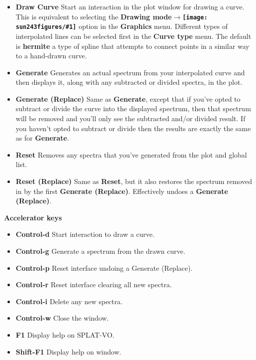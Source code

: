 \documentclass[twoside,11pt]{article}
\newcommand{\htmladdimg}[1]{}
\newcommand{\latexhtml}[2]{#1}
\renewcommand{\_}{\texttt{\symbol{95}}}
\newcommand{\SPLAT}{\textsf{SPLAT-VO}}
\newcommand{\inline}[1]
        {\latexhtml{\texttt{[image: sun243\_figures/\#1]}}
        {\htmladdimg[align=center]{#1.gif}}}
\newcommand{\submenuitem}[2]{\latexhtml{\textbf{#1$\rightarrow$#2}}{\textbf{#1->#2}}}
\newcommand{\labelitem}[1]{\textbf{#1}}
\newcommand{\subheading}[1]{\textbf{\large{#1}}}
\begin{document}
\begin{itemize}

\item \labelitem{Draw Curve} Start an interaction in the plot window for
drawing a curve. This is equivalent to selecting the
\submenuitem{Drawing mode}{\inline{curve}} option in the
\labelitem{Graphics} menu.
Different types of interpolated lines can be selected first in the
\labelitem{Curve type} menu. The default is
\labelitem{hermite} a type of spline that attempts to connect points in a
similar way to a hand-drawn curve.

\item \labelitem{Generate} Generates an actual spectrum from your interpolated
curve and then displays it, along with any subtracted or divided spectra, in
the plot.

\item \labelitem{Generate (Replace)} Same as \labelitem{Generate}, except that
if you've opted to subtract or divide the curve into the displayed spectrum,
then that spectrum will be removed and you'll only see the subtracted and/or
divided result. If you haven't opted to subtract or divide then the results are
exactly the same as for \labelitem{Generate}.

\item \labelitem{Reset} Removes any spectra that you've generated from the
plot and global list.

\item \labelitem{Reset (Replace)} Same as \labelitem{Reset}, but it also
restores the spectrum removed in by the first \labelitem{Generate (Replace)}.
Effectively undoes a \labelitem{Generate (Replace)}.

\end{itemize}

\subheading{Accelerator keys}

\begin{itemize}
\item \labelitem{Control-d} Start interaction to draw a curve.
\item \labelitem{Control-g} Generate a spectrum from the drawn curve.
\item \labelitem{Control-p} Reset interface undoing a Generate (Replace).
\item \labelitem{Control-r} Reset interface clearing all new spectra.
\item \labelitem{Control-i} Delete any new spectra.

\item \labelitem{Control-w} Close the window.
\item \labelitem{F1} Display help on \SPLAT.
\item \labelitem{Shift-F1} Display help on window.
\end{itemize}
\end{document}
